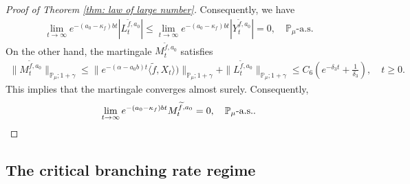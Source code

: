 \documentclass[12pt,a4paper]{amsart}
\theoremstyle{plain}
\theoremstyle{definition}
\numberwithin{equation}{section}
\begin{document}
\begin{proof}[Proof of Theorem \ref{thm: law of large number}]
Consequently,  we have
\begin{align}
  \lim_{t\rightarrow \infty}e^{-(a_0 - \kappa_f)bt}|L_t^{\widetilde{f},a_0}|
  \leq  \lim_{t\rightarrow \infty}e^{-(a_0 - \kappa_f)bt}|Y_t^{\widetilde{f},a_0}|=0, \quad
  \mathbb P_\mu\text{-a.s.}
\end{align}
On the other hand, the martingale $M_t^{\widetilde{f},a_0}$ satisfies
\begin{align}
  \|M_t^{\widetilde{f},a_0}\|_{\mathbb{P}_{\mu};1+\gamma}
  \leq \|e^{-(\alpha-a_0 b)t}\langle \widetilde{f},X_t\rangle)\|_{\mathbb{P}_{\mu};1+\gamma}+\|L_t^{\widetilde{f},a_0}\|_{\mathbb{P}_{\mu};1+\gamma}
  \leq C_6(e^{-\delta_3 t}+\frac{1}{\delta_3}),
  \quad t\geq 0.
\end{align}
This implies that the martingale converges almost surely.
Consequently,
\[
	\lim_{t\rightarrow\infty} e^{-(a_0-\kappa_f)bt}M_t^{\widetilde{f},a_0}
	= 0,
	\quad \mathbb P_\mu\text{-a.s.}.
  \qedhere
\]
\end{proof}

\subsection{The critical branching rate regime}
\label{sec:critical}
\end{document}
